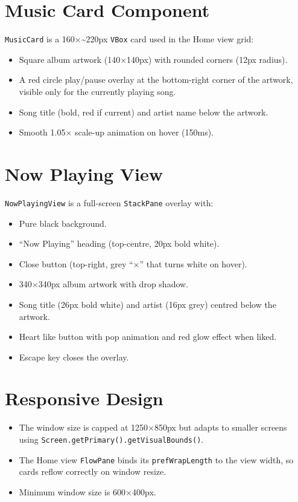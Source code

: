 ﻿\documentclass[12pt]{report}
\begin{document}
\section{Music Card Component}
\texttt{MusicCard} is a 160$\times$\textasciitilde{}220px \texttt{VBox} card used in the Home view grid:
\begin{itemize}
    \item Square album artwork (140$\times$140px) with rounded corners (12px radius).
    \item A red circle play/pause overlay at the bottom-right corner of the artwork, visible only for the currently playing song.
    \item Song title (bold, red if current) and artist name below the artwork.
    \item Smooth 1.05$\times$ scale-up animation on hover (150ms).
\end{itemize}

\section{Now Playing View}
\texttt{NowPlayingView} is a full-screen \texttt{StackPane} overlay with:
\begin{itemize}
    \item Pure black background.
    \item ``Now Playing'' heading (top-centre, 20px bold white).
    \item Close button (top-right, grey ``$\times$'' that turns white on hover).
    \item 340$\times$340px album artwork with drop shadow.
    \item Song title (26px bold white) and artist (16px grey) centred below the artwork.
    \item Heart like button with pop animation and red glow effect when liked.
    \item Escape key closes the overlay.
\end{itemize}

\section{Responsive Design}
\begin{itemize}
    \item The window size is capped at 1250$\times$850px but adapts to smaller screens using \texttt{Screen.getPrimary().getVisualBounds()}.
    \item The Home view \texttt{FlowPane} binds its \texttt{prefWrapLength} to the view width, so cards reflow correctly on window resize.
    \item Minimum window size is 600$\times$400px.
\end{itemize}
\end{document}
